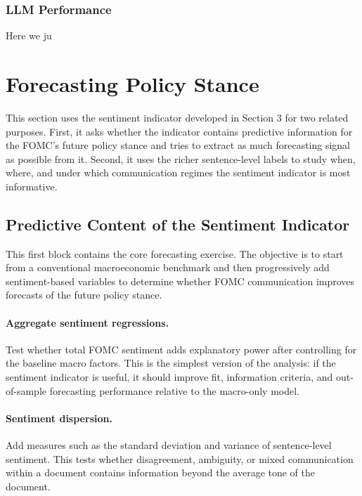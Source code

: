 \documentclass[11pt]{article}
\begin{document}
\subsubsection{LLM Performance}
Here we ju

\subsubsection{}

\section{Forecasting Policy Stance}

This section uses the sentiment indicator developed in Section 3 for two related purposes. First, it asks whether the indicator contains predictive information for the FOMC's future policy stance and tries to extract as much forecasting signal as possible from it. Second, it uses the richer sentence-level labels to study when, where, and under which communication regimes the sentiment indicator is most informative.

\subsection{Predictive Content of the Sentiment Indicator}

This first block contains the core forecasting exercise. The objective is to start from a conventional macroeconomic benchmark and then progressively add sentiment-based variables to determine whether FOMC communication improves forecasts of the future policy stance.

\paragraph{Aggregate sentiment regressions.} Test whether total FOMC sentiment adds explanatory power after controlling for the baseline macro factors. This is the simplest version of the analysis: if the sentiment indicator is useful, it should improve fit, information criteria, and out-of-sample forecasting performance relative to the macro-only model.

\paragraph{Sentiment dispersion.} Add measures such as the standard deviation and variance of sentence-level sentiment. This tests whether disagreement, ambiguity, or mixed communication within a document contains information beyond the average tone of the document.
\end{document}
